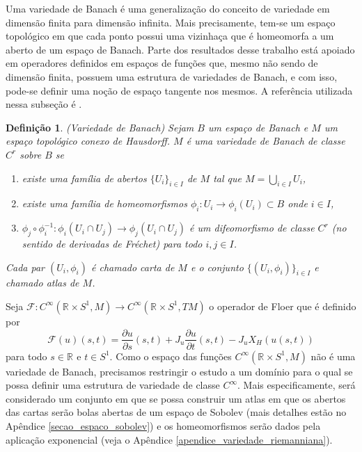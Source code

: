 \documentclass[12pt]{book}
\newtheorem{definicao}[teorema]{Definição}
\newcommand{\aplicaoessuaves}[2]{C^{\infty}(#1, #2)}
\newcommand{\circulo}{S^{1}}
\newcommand{\derivadaparcial}[2]{\frac{\partial #1}{\partial #2}}
\newcommand{\operadorFloer}{\mathcal{F}}
\newcommand{\operadorFloerDefParametros}[1]{\derivadaparcial{#1}{s}(s,t) + J_{#1}\derivadaparcial{#1}{t}(s,t) - J_{#1}X_{H}(#1(s,t))}
\newcommand{\operadorFloerParametro}[1]{\mathcal{F}(#1)}
\newcommand{\retacartesianocirculo}{\real{} \times \circulo}
\newcommand{\real}[1]{\mathbb{R}^{#1}}
\newcommand{\reta}{\real{}}
\begin{document}
	Uma variedade de Banach é uma generalização do conceito de variedade em dimensão finita para dimensão infinita. Mais precisamente, tem-se um espaço topológico em que cada ponto possui uma vizinhaça que é homeomorfa a um aberto de um espaço de Banach. Parte dos resultados desse trabalho está apoiado em operadores definidos em espaços de funções que, mesmo não sendo de dimensão finita, possuem uma estrutura de variedades de Banach, e com isso, pode-se definir uma noção de espaço tangente nos mesmos. A referência utilizada nessa subseção é \cite{chang_morse_infinito}.
	
	\begin{definicao}
		(Variedade de Banach) Sejam $B$ um espaço de Banach e $M$ um espaço topológico conexo de Hausdorff. $M$ é uma variedade de Banach de classe $C^{r}$ sobre $B$ se
		
		\begin{enumerate}
			\item existe uma família de abertos $\{U_{i}\}_{i\in I}$ de $M$ tal que $M=\bigcup_{i\in I}U_{i}$,
			
			\item existe uma família de homeomorfismos $ \phi_{i}:U_{i}\to \phi_{i}(U_{i})\subset B$ onde $i\in I$,
			
			\item $\phi_{j}\circ \phi_{i}^{-1}: \phi_{i}(U_{i}\cap U_{j}) \to \phi_{j}(U_{i}\cap U_{j}) $ é um difeomorfismo de classe $C^{r}$ (no sentido de derivadas de Fréchet) para todo $i,j \in I$.
		\end{enumerate}
		
		Cada par $(U_{i}, \phi_{i})$ é chamado carta de $M$ e  o conjunto $\{(U_{i}, \phi_{i})\}_{i\in I}$ e chamado atlas de $M$.
	\end{definicao}
	
	Seja $\operadorFloer :\aplicaoessuaves{\retacartesianocirculo}{M}\to \aplicaoessuaves{\retacartesianocirculo}{TM}$ o operador de Floer que é definido por 
	$$
	\operadorFloerParametro{u}(s,t)=\operadorFloerDefParametros{u}
	$$
	para todo $s\in \reta$ e $t\in \circulo$. Como o espaço das funções $\aplicaoessuaves{\retacartesianocirculo}{M}$ não é uma variedade de Banach, precisamos restringir o estudo a um domínio para o qual se possa definir uma estrutura de variedade de classe $C^{\infty}$. Mais especificamente,  será considerado um conjunto em que se possa construir um atlas em que os abertos das cartas serão bolas abertas de um espaço de Sobolev (mais detalhes estão no Apêndice \ref{secao_espaco_sobolev}) e os homeomorfismos serão dados pela aplicação exponencial (veja o Apêndice \ref{apendice_variedade_riemanniana}).
	
\end{document}
